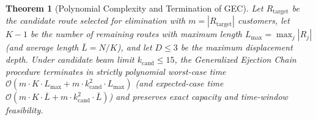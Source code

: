 \documentclass{article}
\newtheorem{theorem}{Theorem}
\begin{document}
\begin{theorem}[Polynomial Complexity and Termination of GEC]
Let $R_{\text{target}}$ be the candidate route selected for elimination with $m = |R_{\text{target}}|$ customers, let $K-1$ be the number of remaining routes with maximum length $L_{\max} = \max_j |R_j|$ (and average length $\bar{L} = N/K$), and let $D \le 3$ be the maximum displacement depth. Under candidate beam limit $k_{\text{cand}} \le 15$, the Generalized Ejection Chain procedure terminates in strictly polynomial worst-case time $\mathcal{O}(m \cdot K \cdot L_{\max} + m \cdot k_{\text{cand}}^2 \cdot L_{\max})$ (and expected-case time $\mathcal{O}(m \cdot K \cdot \bar{L} + m \cdot k_{\text{cand}}^2 \cdot \bar{L})$) and preserves exact capacity and time-window feasibility.
\end{theorem}
\end{document}
